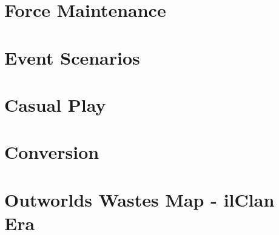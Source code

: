 \documentclass{article}
\begin{document}


\newpage

\section{Force Maintenance}
\label{subsec:event_force_maintenance}



\newpage

\section{Event Scenarios}



\newpage

\section{Casual Play}



\section{Conversion}



\newpage

\section{Outworlds Wastes Map - ilClan Era}


\end{document}
